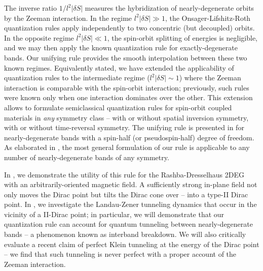 \documentclass[aps, showpacs, twocolumn, notitlepage, superscriptaddress]{revtex4-1}
\begin{document}
The inverse ratio $1/l^2|\delta S|$ measures the hybridization of nearly-degenerate orbits by the Zeeman interaction. In the regime $l^2|\delta S|{\gg}1$, the Onsager-Lifshitz{-Roth} quantization rules apply independently to  two concentric (but decoupled) orbits. In the opposite regime $l^2|\delta S|{\ll}1$, the spin-orbit splitting of energies is negligible, and we may then apply the known quantization rule for exactly-degenerate bands\cite{rotheffham,rothmag,topoferm,100p,Mikitik_quantizationrule}. Our unifying rule provides the smooth interpolation between these two known regimes. {Equivalently stated, we have extended the applicability of quantization rules to the intermediate regime ($l^2|\delta S|{\sim}1$) where the Zeeman interaction is comparable with the spin-orbit interaction; previously, such rules were known only when one interaction dominates over the other. This extension allows  to formulate semiclassical quantization rules for spin-orbit coupled materials in \textit{any} symmetry class -- with or without spatial inversion symmetry, with or without time-reversal symmetry. The unifying rule is presented in  for nearly-degenerate bands with a spin-half (or pseudospin-half) degree of freedom. As elaborated in , the most general formulation of our rule is applicable  to any number of nearly-degenerate bands of any symmetry.}

In , we demonstrate the utility of this rule for the Rashba{-Dresselhaus} 2DEG with an arbitrarily-oriented magnetic field. A sufficiently strong in-plane field not only moves the Dirac point but tilts the Dirac cone over -- into a type-II\cite{soluyanov_type-ii_2015, muechler_tilted_2016, bergholtz_topology_2015} Dirac point. In , we investigate the Landau-Zener tunneling dynamics that occur in the vicinity of a II-Dirac point; in particular, we will {demonstrate that our quantization rule can account for quantum tunneling between nearly-degenerate bands -- a phenomenon known as interband breakdown\cite{kaganov_coherent_1983,slutskin_dynamics_1968,AALG,100p}. We will also} critically evaluate a recent claim\cite{obrien_magnetic_2016} of perfect Klein tunneling at the energy of the Dirac point -- we find that such tunneling is never perfect with a proper account of the Zeeman interaction.
\end{document}

